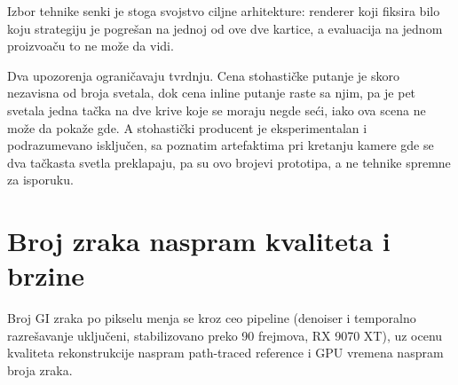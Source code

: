 Izbor tehnike senki je stoga svojstvo ciljne arhitekture: renderer koji
fiksira bilo koju strategiju je pogre\v{s}an na jednoj od ove dve kartice, a evaluacija na jednom proizvo\dj a\v{c}u to
ne mo\v{z}e da vidi.

Dva upozorenja ograni\v{c}avaju tvrdnju. Cena stohasti\v{c}ke putanje je skoro nezavisna od broja svetala, dok
cena inline putanje raste sa njim, pa je pet svetala jedna ta\v{c}ka na dve krive koje se moraju
negde se\'ci, iako ova scena ne mo\v{z}e da poka\v{z}e gde. A stohasti\v{c}ki producent je eksperimentalan i podrazumevano isklju\v{c}en, sa poznatim
artefaktima pri kretanju kamere gde se dva ta\v{c}kasta svetla preklapaju, pa su ovo brojevi prototipa,
a ne tehnike spremne za isporuku.

\section{Broj zraka naspram kvaliteta i brzine}
\label{sec:raycount}

Broj GI zraka po pikselu menja se kroz ceo pipeline (denoiser i temporalno razre\v{s}avanje uklju\v{c}eni,
stabilizovano preko 90 frejmova, RX 9070 XT), uz ocenu kvaliteta rekonstrukcije naspram path-traced reference
i GPU vremena naspram broja zraka.

\begin{table}[htb]
\centering
\caption[Kvalitet i GPU cena GI u zavisnosti od broja zraka po pikselu]{Kvalitet i GPU cena GI kao funkcija
zraka po pikselu (denoiser i temporalno razre\v{s}avanje uklju\v{c}eni, RX 9070 XT). GPU ukupno je GI-only
konfiguracija sa ostala tri efekta isklju\v{c}ena, pa je manji frejm od ukupnog
\texttt{+gi} iz Tabele~\ref{tab:cena}: isto apsolutno pove\'canje je \rcGpuPct\% ovog
frejma i otprilike tre\'cina punog frejma sa \v{c}etiri efekta.}
\label{tab:raycount}

\end{table}

